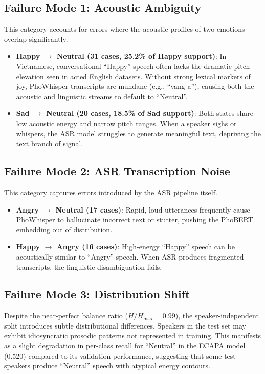 \documentclass[12pt,a4paper]{report}
\begin{document}
\subsection{Failure Mode 1: Acoustic Ambiguity}
This category accounts for errors where the acoustic profiles of two emotions overlap significantly.
\begin{itemize}
    \item \textbf{Happy $\rightarrow$ Neutral (31 cases, 25.2\% of Happy support)}: In Vietnamese, conversational ``Happy'' speech often lacks the dramatic pitch elevation seen in acted English datasets. Without strong lexical markers of joy, PhoWhisper transcripts are mundane (e.g., ``vang a''), causing both the acoustic and linguistic streams to default to ``Neutral''.
    \item \textbf{Sad $\rightarrow$ Neutral (20 cases, 18.5\% of Sad support)}: Both states share low acoustic energy and narrow pitch ranges. When a speaker sighs or whispers, the ASR model struggles to generate meaningful text, depriving the text branch of signal.
\end{itemize}

\subsection{Failure Mode 2: ASR Transcription Noise}
This category captures errors introduced by the ASR pipeline itself.
\begin{itemize}
    \item \textbf{Angry $\rightarrow$ Neutral (17 cases)}: Rapid, loud utterances frequently cause PhoWhisper to hallucinate incorrect text or stutter, pushing the PhoBERT embedding out of distribution.
    \item \textbf{Happy $\rightarrow$ Angry (16 cases)}: High-energy ``Happy'' speech can be acoustically similar to ``Angry'' speech. When ASR produces fragmented transcripts, the linguistic disambiguation fails.
\end{itemize}

\subsection{Failure Mode 3: Distribution Shift}
Despite the near-perfect balance ratio ($H/H_{\max} = 0.99$), the speaker-independent split introduces subtle distributional differences. Speakers in the test set may exhibit idiosyncratic prosodic patterns not represented in training. This manifests as a slight degradation in per-class recall for ``Neutral'' in the ECAPA model (0.520) compared to its validation performance, suggesting that some test speakers produce ``Neutral'' speech with atypical energy contours.
\end{document}

